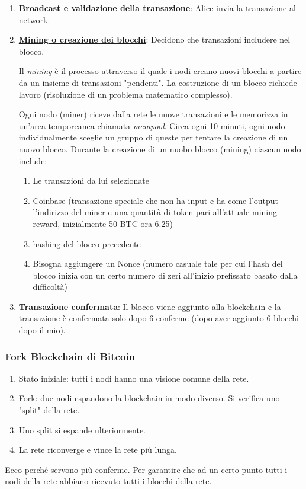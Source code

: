 \documentclass[a4paper]{article}
\begin{document}
\begin{enumerate}
\begin{itemize}
\begin{definition}
        \end{definition}
    \end{itemize}  
    \item \underline{\textbf{Broadcast e validazione della transazione}}: Alice invia la transazione al network.
    \item \underline{\textbf{Mining o creazione dei blocchi}}: Decidono che transazioni includere nel blocco. 
    \begin{definition}
        Il \textit{mining} è il processo attraverso il quale i nodi creano nuovi blocchi a partire da un insieme di transazioni "pendenti". 
        La costruzione di un blocco richiede lavoro (risoluzione di un problema matematico complesso).
    \end{definition}
    Ogni nodo (miner) riceve dalla rete le nuove transazioni e le memorizza in un'area temporeanea chiamata \textit{mempool}. 
    Circa ogni 10 minuti, ogni nodo individualmente sceglie un gruppo di queste per tentare la creazione di un nuovo blocco.
    Durante la creazione di un nuobo blocco (mining) ciascun nodo include:
    \begin{enumerate}
        \item Le transazioni da lui selezionate
        \item Coinbase (transazione speciale che non ha input e ha come l'output l'indirizzo del miner e una quantità di token pari all'attuale mining reward, inizialmente 50 BTC ora 6.25)
        \item hashing del blocco precedente
        \item Bisogna aggiungere un Nonce (numero casuale tale per cui l'hash del blocco inizia con un certo numero di zeri all'inizio prefissato basato dalla difficoltà)
    \end{enumerate}
    \item \textbf{\underline{Transazione confermata}}: Il blocco viene aggiunto alla blockchain e 
    la transazione è confermata solo dopo 6 conferme (dopo aver aggiunto 6 blocchi dopo il mio). 
\end{enumerate}

\subsubsection{Fork Blockchain di Bitcoin}

\begin{enumerate}
    \item Stato iniziale: tutti i nodi hanno una visione comune della rete.
    \item Fork: due nodi espandono la blockchain in modo diverso. Si verifica uno "split" della rete.
    \item Uno split si espande ulteriormente.
    \item La rete riconverge e vince la rete più lunga.
\end{enumerate}
Ecco perché servono più conferme. Per garantire che ad un certo punto tutti i nodi della rete abbiano ricevuto tutti i blocchi della rete.
\end{document}
